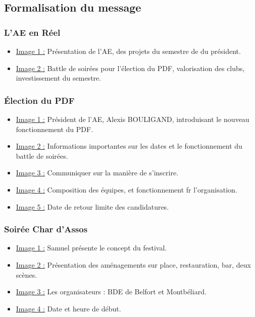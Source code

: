 
\subsection{Formalisation du message}\label{subsec:formalisation-du-message}

\subsubsection{L'AE en Réel}
\begin{itemize}
    \item \underline{Image 1 :} Présentation de l'\gls{AE}, des projets du semestre de du président.
    \item \underline{Image 2 :} Battle de soirées pour l'élection du PDF, valorisation des clubs, investissement du semestre.
\end{itemize}

\subsubsection{Élection du PDF}
\begin{itemize}
    \item \underline{Image 1 :} Président de l'AE, Alexis BOULIGAND, introduisant le nouveau fonctionnement du PDF.
    \item \underline{Image 2 :} Informations importantes sur les dates et le fonctionnement du battle de soirées.
    \item \underline{Image 3 :} Communiquer sur la manière de s'inscrire.
    \item \underline{Image 4 :} Composition des équipes, et fonctionnement fr l'organisation.
    \item \underline{Image 5 :} Date de retour limite des candidatures.
\end{itemize}

\subsubsection{Soirée Char d’Assos}
\begin{itemize}
    \item \underline{Image 1 :} Samuel présente le concept du festival.
    \item \underline{Image 2 :} Présentation des aménagements sur place, restauration, bar, deux scènes.
    \item \underline{Image 3 :} Les organisateurs : BDE de Belfort et Montbéliard.
    \item \underline{Image 4 :} Date et heure de début.
\end{itemize}

